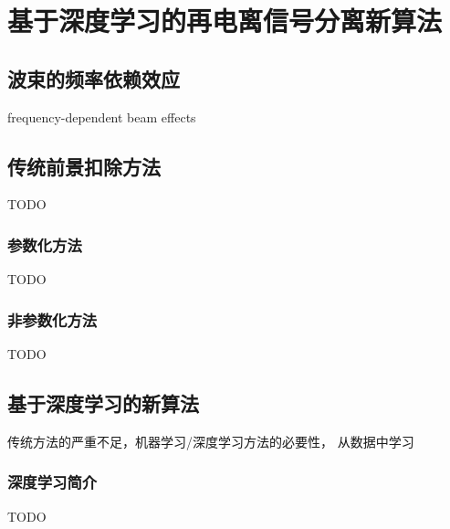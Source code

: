 
\chapter{基于深度学习的再电离信号分离新算法}
\label{chap:cdae}

\section{波束的频率依赖效应}

frequency-dependent beam effects


\section{传统前景扣除方法}

TODO

\subsection{参数化方法}

TODO

\subsection{非参数化方法}

TODO


\section{基于深度学习的新算法}

传统方法的严重不足，机器学习/深度学习方法的必要性，
从数据中学习

\subsection{深度学习简介}

TODO

